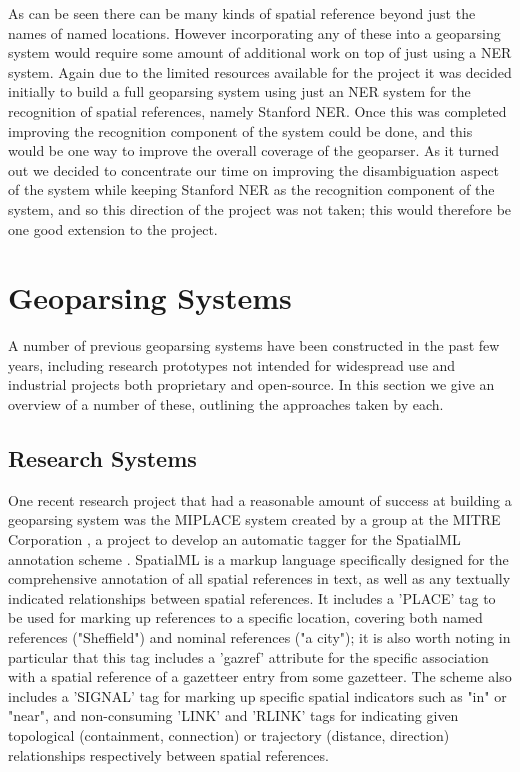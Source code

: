 \documentclass[12pt, a4paper]{report}
\begin{document}
As can be seen there can be many kinds of spatial reference beyond just the names of named locations. However incorporating any of these into a geoparsing system would require some amount of additional work on top of just using a NER system. Again due to the limited resources available for the project it was decided initially to build a full geoparsing system using just an NER system for the recognition of spatial references, namely Stanford NER. Once this was completed improving the recognition component of the system could be done, and this would be one way to improve the overall coverage of the geoparser. As it turned out we decided to concentrate our time on improving the disambiguation aspect of the system while keeping Stanford NER as the recognition component of the system, and so this direction of the project was not taken; this would therefore be one good extension to the project.

\section{Geoparsing Systems}

A number of previous geoparsing systems have been constructed in the past few years, including research prototypes not intended for widespread use and industrial projects both proprietary and open-source. In this section we give an overview of a number of these, outlining the approaches taken by each.

\subsection{Research Systems}

One recent research project that had a reasonable amount of success at building a geoparsing system was the MIPLACE system created by a group at the MITRE Corporation \citep{mani2010}, a project to develop an automatic tagger for the SpatialML annotation scheme \citep{spatialml2009}. SpatialML is a markup language specifically designed for the comprehensive annotation of all spatial references in text, as well as any textually indicated relationships between spatial references. It includes a 'PLACE' tag to be used for marking up references to a specific location, covering both named references ("Sheffield") and nominal references ("a city"); it is also worth noting in particular that this tag includes a 'gazref' attribute for the specific association with a spatial reference of a gazetteer entry from some gazetteer. The scheme also includes a 'SIGNAL' tag for marking up specific spatial indicators such as "in" or "near", and non-consuming 'LINK' and 'RLINK' tags for indicating given topological (containment, connection) or trajectory (distance, direction) relationships respectively between  spatial references.
\end{document}
